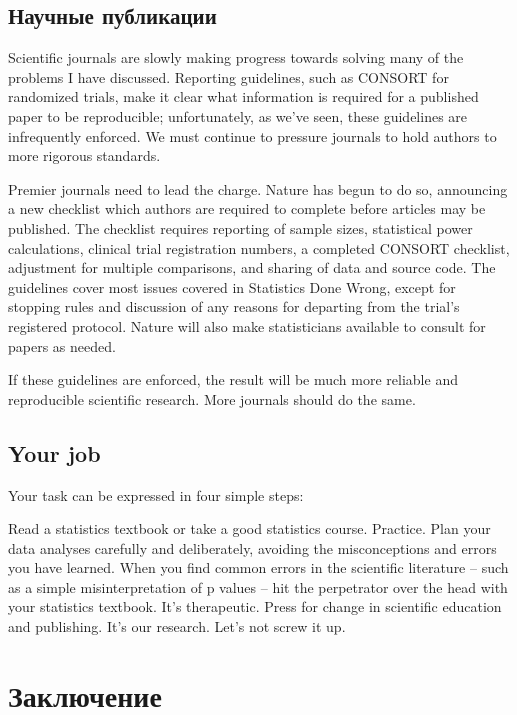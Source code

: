 \section{Научные публикации}
\label{chp12:sciencepublishing}

Scientific journals are slowly making progress towards solving many of the problems I have discussed. Reporting guidelines, such as CONSORT for randomized trials, make it clear what information is required for a published paper to be reproducible; unfortunately, as we’ve seen, these guidelines are infrequently enforced. We must continue to pressure journals to hold authors to more rigorous standards.

Premier journals need to lead the charge. Nature has begun to do so, announcing a new checklist which authors are required to complete before articles may be published. The checklist requires reporting of sample sizes, statistical power calculations, clinical trial registration numbers, a completed CONSORT checklist, adjustment for multiple comparisons, and sharing of data and source code. The guidelines cover most issues covered in Statistics Done Wrong, except for stopping rules and discussion of any reasons for departing from the trial’s registered protocol. Nature will also make statisticians available to consult for papers as needed.

If these guidelines are enforced, the result will be much more reliable and reproducible scientific research. More journals should do the same.

\section{Your job}
\label{chp12:yourjob}

Your task can be expressed in four simple steps:

    Read a statistics textbook or take a good statistics course. Practice.
    Plan your data analyses carefully and deliberately, avoiding the misconceptions and errors you have learned.
    When you find common errors in the scientific literature – such as a simple misinterpretation of p values – hit the perpetrator over the head with your statistics textbook. It’s therapeutic.
    Press for change in scientific education and publishing. It’s our research. Let’s not screw it up.


\chapter*{Заключение}
\label{chp13}


